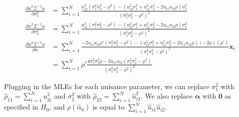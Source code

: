 \documentclass[aoas,authoryear, preprint]{imsart}
\numberwithin{equation}{section}
\theoremstyle{plain}
\begin{document}
\begin{align*} \frac{\partial u^T \Sigma^{-1}u}{\partial \sigma_1^2}
&= 
\sum_{i=1}^{N}\frac{
	u_{i2}^2(\sigma_1^2\sigma_2^2 - \rho^2) - (u_{i2}^2\sigma_1^2 + u_{i1}^2\sigma_2^2 - 2u_{i1}u_{i2}\rho)\sigma_2^2
}{
	(\sigma_1^2\sigma_2^2 - \rho^2)^2
}\\
  \frac{\partial u^T \Sigma^{-1}u}{\partial \sigma_2^2}
  &= 
\sum_{i=1}^{N} \frac{
 u_{i1}^2(\sigma_1^2\sigma_2^2 - \rho^2) - (u_{i2}^2\sigma_1^2 + u_{i1}^2\sigma_2^2 - 2u_{i1}u_{i2}\rho)\sigma_1^2
 }{
 (\sigma_1^2\sigma_2^2 - \rho^2)^2
 }\\
   \frac{\partial u^T \Sigma^{-1}u}{\partial \alpha}
  &= 
 \sum_{i=1}^{N}\frac{-2u_{i1}u_{i2}\rho'(\sigma_1^2\sigma_2^2 - \rho^2) - (u_{i2}^2\sigma_1^2 + u_{i1}^2\sigma_2^2 - 2u_{i1}u_{i2}\rho)(-2\rho)(\rho')
 }{
 (\sigma_1^2\sigma_2^2 - \rho^2)^2
 }\bm{x}_i\\
 &= \sum_{i=1}^{N} \rho' \frac{4\sigma_1^2\sigma_2^2\rho - 2u_{i1}u_{i2}(\sigma_1^2\sigma_2^2 - \rho^2)}{(\sigma_1^2\sigma_2^2 - \rho^2)^2}
 \end{align*}
 
 Plugging in the MLEs for each nuisance parameter, we can replace $\sigma_1^2$ with $\hat{\rho}_{11} = \sum_{i=1}^{N} u_{2i}^2$ and $\sigma_2^2$ with $\hat{\rho}_{22} = \sum_{i=1}^{N} \hat{u}_{i2}^2$. We also replace $\bm{\alpha}$ with $\bm{0}$ as specified in $H_0$, and $\rho(\hat{\alpha}_0)$ is equal to $\sum_{i=1}^{N} \hat{u}_{i1}\hat{u}_{i2}$. 
\end{document}
